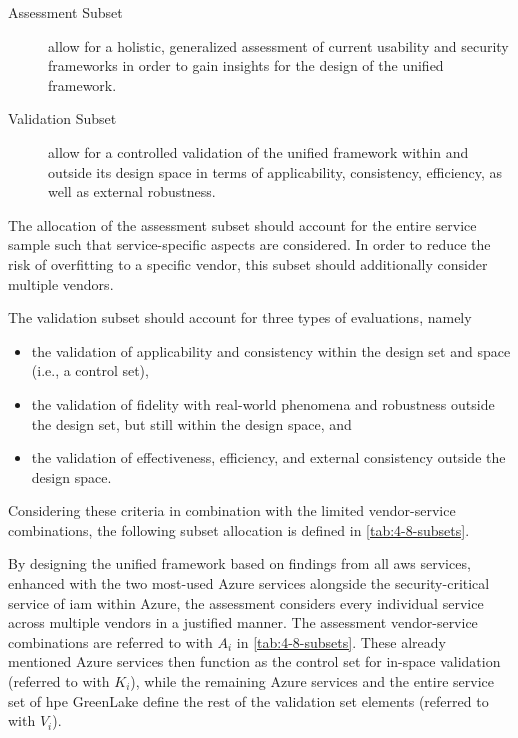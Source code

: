\begin{description}
	\item[Assessment Subset] allow for a holistic, generalized assessment of current usability and security frameworks in order to gain insights for the design of the unified framework.
	\item[Validation Subset] allow for a controlled validation of the unified framework within and outside its design space in terms of applicability, consistency, efficiency, as well as external robustness.
\end{description}

The allocation of the assessment subset should account for the entire service sample such that service-specific aspects are considered. In order to reduce the risk of overfitting to a specific vendor, this subset should additionally consider multiple vendors.

The validation subset should account for three types of evaluations, namely
\begin{itemize}
	\item the validation of applicability and consistency within the design set and space (i.e., a control set),
	\item the validation of fidelity with real-world phenomena and robustness outside the design set, but still within the design space, and
	\item the validation of effectiveness, efficiency, and external consistency outside the design space. 
\end{itemize}

Considering these criteria in combination with the limited vendor-service combinations, the following subset allocation is defined in \autoref{tab:4-8-subsets}.


By designing the unified framework based on findings from all \ac{aws} services, enhanced with the two most-used Azure services alongside the security-critical service of \ac{iam} within Azure, the assessment considers every individual service across multiple vendors in a justified manner. The assessment vendor-service combinations are referred to with $A_i$ in \autoref{tab:4-8-subsets}. These already mentioned Azure services then function as the control set for in-space validation (referred to with $K_i$), while the remaining Azure services and the entire service set of \ac{hpe} GreenLake define the rest of the validation set elements (referred to with $V_i$). 

